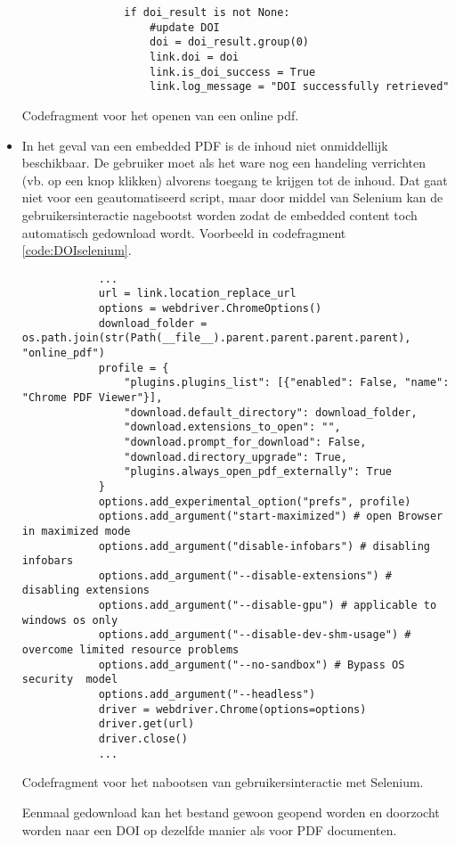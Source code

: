 \begin{itemize}
\begin{listing}
\begin{verbatim}
                if doi_result is not None:
                    #update DOI
                    doi = doi_result.group(0)
                    link.doi = doi
                    link.is_doi_success = True
                    link.log_message = "DOI successfully retrieved"
        \end{verbatim}
        \caption[Pymupdf codefragment]{Codefragment voor het openen van een online pdf.}
        \label{code:DOIpymupdf}
    \end{listing}
    \item In het geval van een embedded PDF is de inhoud niet onmiddellijk beschikbaar. De gebruiker moet als het ware nog een handeling verrichten (vb. op een knop klikken) alvorens toegang te krijgen tot de inhoud. Dat gaat niet voor een geautomatiseerd script, maar door middel van Selenium \autocite{Selenium2025} kan de gebruikersinteractie nagebootst worden zodat de embedded content toch automatisch gedownload wordt. Voorbeeld in codefragment \ref{code:DOIselenium}.
    \begin{listing}
        \begin{verbatim}
            ...
            url = link.location_replace_url
            options = webdriver.ChromeOptions()
            download_folder = os.path.join(str(Path(__file__).parent.parent.parent.parent), "online_pdf")
            profile = {
                "plugins.plugins_list": [{"enabled": False, "name": "Chrome PDF Viewer"}],
                "download.default_directory": download_folder,
                "download.extensions_to_open": "",
                "download.prompt_for_download": False,
                "download.directory_upgrade": True,
                "plugins.always_open_pdf_externally": True
            }
            options.add_experimental_option("prefs", profile)
            options.add_argument("start-maximized") # open Browser in maximized mode
            options.add_argument("disable-infobars") # disabling infobars
            options.add_argument("--disable-extensions") # disabling extensions
            options.add_argument("--disable-gpu") # applicable to windows os only
            options.add_argument("--disable-dev-shm-usage") # overcome limited resource problems
            options.add_argument("--no-sandbox") # Bypass OS security  model
            options.add_argument("--headless")
            driver = webdriver.Chrome(options=options)
            driver.get(url)
            driver.close()
            ...
        \end{verbatim}
        \caption[Selenium codefragment]{Codefragment voor het nabootsen van gebruikersinteractie met Selenium.}
        \label{code:DOIselenium}
    \end{listing} Eenmaal gedownload kan het bestand gewoon geopend worden en doorzocht worden naar een DOI op dezelfde manier als voor PDF documenten.
\end{itemize}
